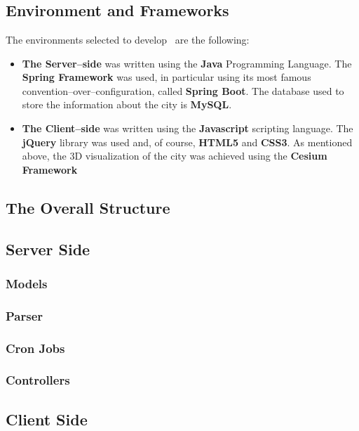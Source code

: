 \section{\applicationName} \label{projectDesign}
\subsection{Environment and Frameworks}
The environments selected to develop \applicationName\ are the following:
\begin{itemize}
	\item {\bf The Server--side} was written using the {\bf Java} Programming Language. The {\bf Spring Framework} was used, in particular using its most famous convention--over--configuration, called {\bf Spring Boot}. The database used to store the information about the city is {\bf MySQL}.
	\item {\bf The Client--side} was written using the {\bf Javascript} scripting language. The {\bf jQuery} library was used and, of course, {\bf HTML5} and {\bf CSS3}. As mentioned above, the 3D visualization of the city was achieved using the {\bf Cesium Framework}
\end{itemize}

\subsection{The Overall Structure}

\subsection{Server Side}
\subsubsection{Models}
\subsubsection{Parser}
\subsubsection{Cron Jobs}
\subsubsection{Controllers}
\subsection{Client Side}
